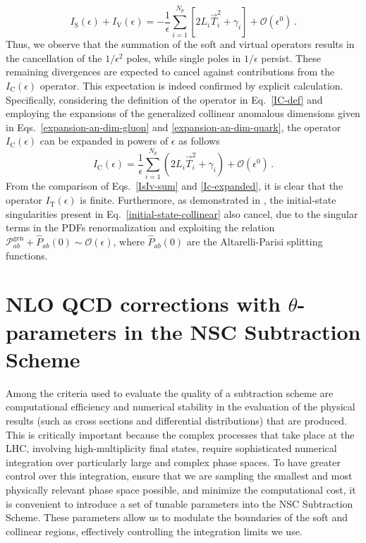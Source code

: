 \documentclass[a4paper, 12pt]{book}
\begin{document}
\begin{equation}
  I_{\mathrm{S}}(\epsilon)+I_{\mathrm{V}}(\epsilon)= - \frac{1}{\epsilon} \sum_{i=1}^{N_p} \left[2 L_i \vec{T}_i^2 + \gamma _i\right] + \mathcal{O}(\epsilon^0)\, .
  \label{IsIv-sum}
\end{equation}
Thus, we observe that the summation of the soft and virtual operators results in the cancellation of the $1/\epsilon^2$ poles, while single poles in $1/\epsilon$ persist. These remaining divergences are expected to cancel against contributions from the $I_{\mathrm{C}}(\epsilon)$ operator. This expectation is indeed confirmed by explicit calculation. Specifically, considering the definition of the operator in Eq.~\ref{IC-def} and employing the expansions of the generalized collinear anomalous dimensions given in Eqs.~\ref{expansion-an-dim-gluon} and \ref{expansion-an-dim-quark}, the operator $I_{\mathrm{C}}(\epsilon)$ can be expanded in powers of $\epsilon$ as follows
\begin{equation}
  I_{\mathrm{C}}(\epsilon)= \frac{1}{\epsilon}\sum_{i=1}^{N_p} \left( 2 L_i \vec{T}_i^2 + \gamma _i \right) + \mathcal{O}(\epsilon^0)\, .
  \label{Ic-expanded}
\end{equation}
From the comparison of Eqs.~\ref{IsIv-sum} and \ref{Ic-expanded}, it is clear that the operator $I_{\mathrm{T}}(\epsilon)$ is finite. Furthermore, as demonstrated in \cite{Devoto:2025kin}, the initial-state singularities present in Eq.~\ref{initial-state-collinear} also cancel, due to the singular terms in the PDFs renormalization and exploiting the relation $\mathcal{P}_{ab}^{\mathrm{gen}}+\hat{P}_{ab}(0) \sim \mathcal{O}(\epsilon)$, where $\hat{P}_{ab}(0)$ are the Altarelli-Parisi splitting functions.

\clearpage

\chapter{NLO QCD corrections with $\theta$-parameters in the NSC Subtraction Scheme}
\label{NSC-SS-parameters}
Among the criteria used to evaluate the quality of a subtraction scheme are computational efficiency and numerical stability in the evaluation of the physical results (such as cross sections and differential distributions) that are produced. This is critically important because the complex processes that take place at the LHC, involving high-multiplicity final states, require sophisticated numerical integration over particularly large and complex phase spaces. To have greater control over this integration, ensure that we are sampling the smallest and most physically relevant phase space possible, and minimize the computational cost, it is convenient to introduce a set of tunable parameters into the NSC Subtraction Scheme. These parameters allow us to modulate the boundaries of the soft and collinear regions, effectively controlling the integration limits we use.
\end{document}
